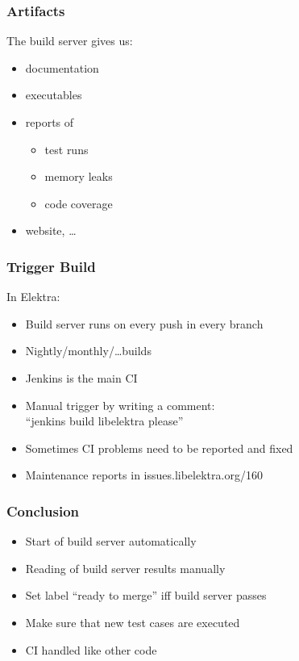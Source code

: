 \begin{frame}
	\frametitle{Artifacts}

	The build server gives us:

	\begin{itemize}[<+-| alert@+>]
	\item documentation
	\item executables
	\item reports of
	\begin{itemize}
	\item test runs
	\item memory leaks
	\item code coverage
	\end{itemize}
	\item website, \dots
	\end{itemize}
\end{frame}

\begin{frame}
	\frametitle{Trigger Build}

	In Elektra:
	\begin{itemize}[<+-| alert@+>]
	\item Build server runs on every push in every branch
	\item Nightly/monthly/\dots builds
	\item Jenkins is the main CI
	\item Manual trigger by writing a comment: \\ ``jenkins build libelektra please''
	\item Sometimes CI problems need to be reported and fixed
	\item Maintenance reports in issues.libelektra.org/160
	\end{itemize}
\end{frame}

\begin{frame}
	\frametitle{Conclusion}

	\begin{itemize}[<+-| alert@+>]
	\item Start of build server automatically
	\item Reading of build server results manually
	\item Set label ``ready to merge'' iff build server passes
	\item Make sure that new test cases are executed
	\item CI handled like other code
	\end{itemize}
\end{frame}

